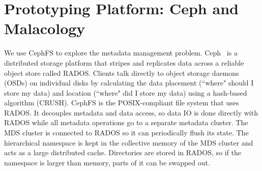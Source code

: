 \chapter{Prototyping Platform: Ceph and Malacology}
\label{chp:malacology}

We use CephFS to explore the metadata management problem.
Ceph~\cite{weil:osdi2006-ceph} is a distributed storage platform that stripes
and replicates data across a reliable object store called RADOS. Clients talk
directly to object storage daemons (OSDs) on individual disks by calculating
the data placement (``where" should I store my data) and location (``where" did
I store my data) using a hash-based algorithm (CRUSH). CephFS is the
POSIX-compliant file system that uses RADOS. It decouples metadata and data
access, so data IO is done directly with RADOS while all metadata operations go
to a separate metadata cluster. The MDS cluster is connected to RADOS so it can
periodically flush its state. The hierarchical namespace is kept in the
collective memory of the MDS cluster and acts as a large distributed cache.
Directories are stored in RADOS, so if the namespace is larger than memory,
parts of it can be swapped out. 


